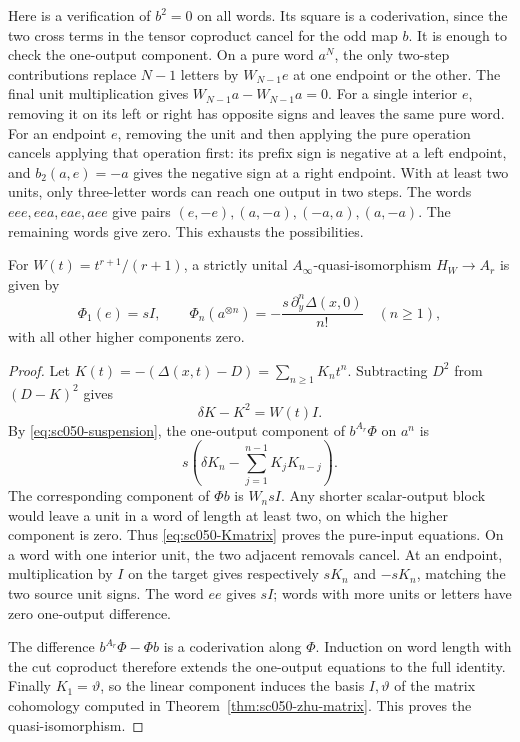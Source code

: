 Here is a verification of \(b^2=0\) on all words. Its square is
a coderivation, since the two cross terms in the tensor
coproduct cancel for the odd map \(b\). It is enough to check
the one-output component. On a pure word \(a^N\), the only
two-step contributions replace \(N-1\) letters by \(W_{N-1}e\)
at one endpoint or the other. The final unit multiplication
gives \(W_{N-1}a-W_{N-1}a=0\).
For a single interior \(e\), removing it on its left or right
has opposite signs and leaves the same pure word.
For an endpoint \(e\), removing the unit and then applying the
pure operation cancels applying that operation first: its
prefix sign is negative at a left endpoint, and
\(b_2(a,e)=-a\) gives the negative sign at a right endpoint.
With at least two units, only three-letter words can reach one
output in two steps. The words \(eee,eea,eae,aee\) give pairs
\((e,-e),(a,-a),(-a,a),(a,-a)\).
The remaining words give zero. This exhausts the possibilities.

\begin{theorem}\label{thm:sc050-boundary-matrix}
For \(W(t)=t^{r+1}/(r+1)\), a strictly unital
\(A_\infty\)-quasi-isomorphism \(H_W\to A_r\) is given by
\[
 \Phi_1(e)=sI,\qquad
 \Phi_n(a^{\otimes n})
       =-\frac{s\,\partial_y^n\Delta(x,0)}{n!}\quad(n\ge1),
\]
with all other higher components zero.
\end{theorem}
\begin{proof}
Let \(K(t)=-(\Delta(x,t)-D)=\sum_{n\ge1}K_nt^n\).
Subtracting \(D^2\) from \((D-K)^2\) gives
\begin{equation}\label{eq:sc050-Kmatrix}
 \delta K-K^2=W(t)I.
\end{equation}
By \eqref{eq:sc050-suspension}, the one-output component of
\(b^{A_r}\Phi\) on \(a^n\) is
\[
 s\left(\delta K_n-\sum_{j=1}^{n-1}K_jK_{n-j}\right).
\]
The corresponding component of \(\Phi b\) is \(W_nsI\).
Any shorter scalar-output block would leave a unit in a word
of length at least two, on which the higher component is zero.
Thus \eqref{eq:sc050-Kmatrix} proves the pure-input equations.
On a word with one interior unit, the two adjacent removals
cancel. At an endpoint, multiplication by \(I\) on the target
gives respectively \(sK_n\) and \(-sK_n\), matching the two
source unit signs. The word \(ee\) gives \(sI\); words with more
units or letters have zero one-output difference.

The difference \(b^{A_r}\Phi-\Phi b\) is a coderivation along
\(\Phi\). Induction on word length with the cut coproduct
therefore extends the one-output equations to the full identity.
Finally \(K_1=\vartheta\), so the linear component induces the
basis \(I,\vartheta\) of the matrix cohomology computed in
Theorem~\ref{thm:sc050-zhu-matrix}. This proves the
quasi-isomorphism.
\end{proof}

